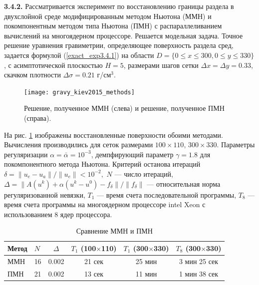 {\bfseries 3.4.2.} Рассматривается эксперимент по восстановлению границы раздела в двухслойной среде модифицированным методом Ньютона (ММН) и покомпонентным методом типа Ньютона (ПМН) с распараллеливанием вычислений на многоядерном процессоре. Решается модельная задача. Точное решение уравнения гравиметрии, определяющее поверхность раздела сред, задается формулой (\ref{exact_exp3.4.1}) на области $D=\{0\le x\le 300, 0\le y\le 330\}$, с асимптотической плоскостью $  H=5$, размерами шагов сетки $\Delta x=\Delta y=0.33$, скачком плотности $\Delta\sigma=0.21$ г/см$^3$.
\begin{figure}
	\centering
	\texttt{[image: gravy\_kiev2015\_methods]}
	\caption{Решение, полученное ММН (слева) и решение, полученное ПМН (справа).}
	\label{fig:gravy_kiev2015_methods}
\end{figure}
На рис. \ref{fig:gravy_kiev2015_methods} изображены восстановленные поверхности обоими методами. Вычисления производились для сеток размерами $100\times 110$, $300\times 330$. Параметры регуляризации $\alpha=\bar{\alpha}=10^{-3}$, демпфирующий параметр $\gamma=1.8$ для покомпонентного метода Ньютона. Критерий останова итераций $\delta=\|u_e-u_a\|/\|u_e\|<10^{-2},$ $N$ --- число итераций, 
$\Delta=\|A(u^k)+\alpha(u^k-u^0)-f_\delta\|/\|f_\delta\|$ --- относительная норма регуляризованной невязки, $T_1$ --- время счета последовательной программы, $T_8$ --- время счета программы на многоядерном процессоре intel Xeon с использованием 8 ядер процессора.
\begin{table}[]
	\centering
	\caption{Сравнение ММН и ПМН}
	\label{table3.5}
	\begin{tabular}{|p{}|p{}|c|c|c|c|}
		\hline
		\multicolumn{1}{|c|}{\textbf{Метод}} & \textbf{$N$} &
		\textbf{$\Delta$} & \textbf{$T_1$ (100$\times$110)} & \textbf{$T_1$ (300$\times$330)} & \textbf{$T_8$ (300$\times$330)} \\ \hline
		ММН       & 16             &    0.002     & 21 сек          & 25 мин          & 3 мин 25 сек    \\ \hline
		ПМН    & 21             &     0.002    & 13 сек          & 11 мин          & 1 мин 38 сек    \\ \hline
	\end{tabular}
\end{table}

